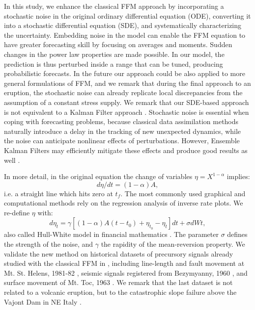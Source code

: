 \documentclass{article}
\begin{document}
In this study, we enhance the classical FFM approach by incorporating a stochastic noise in the original ordinary differential equation (ODE), converting it into a stochastic differential equation (SDE), and systematically characterizing the uncertainty. Embedding noise in the model can enable the FFM equation to have greater forecasting skill by focusing on averages and moments. Sudden changes in the power law properties are made possible. In our model, the prediction is thus perturbed inside a range that can be tuned, producing probabilistic forecasts. In the future our approach could be also applied to more general formulations of FFM, and we remark that during the final approach to an eruption, the stochastic noise can already replicate local discrepancies from the assumption of a constant stress supply. We remark that our SDE-based approach is not equivalent to a Kalman Filter approach \citep{Zhan2017}. Stochastic noise is essential when coping with forecasting problems, because classical data assimilation methods naturally introduce a delay in the tracking of new unexpected dynamics, while the noise can anticipate nonlinear effects of perturbations. However, Ensemble Kalman Filters may efficiently mitigate these effects and produce good results as well \citep{Houtekamer1998, Evensen2003}.

In more detail, in the original equation the change of variables $\eta=X^{1-\alpha}$ implies:
$$d\eta/dt=(1-\alpha)A,$$
i.e. a straight line which hits zero at $t_f$. The most commonly used graphical and computational methods rely on the regression analysis of inverse rate plots. We re-define $\eta$ with:
$$d\eta_t=\gamma[(1-\alpha)A(t-t_0)+\eta_{t_0}-\eta_t]dt+\sigma dWt,$$
also called Hull-White model in financial mathematics \citep{HullWhite1990}. The parameter $\sigma$ defines the strength of the noise, and $\gamma$ the rapidity of the mean-reversion property. We validate the new method on historical datasets of precursory signals already studied with the classical FFM in \cite{Voight1988}, including line-length and fault movement at Mt. St. Helens, 1981-82 \citep{Swanson1982,Chadwick1982}, seismic signals registered from Bezymyanny, 1960 \citep{Tokarev1966,Tokarev1971,Tokarev1983}, and surface movement of Mt. Toc, 1963 \citep{Muller1964,Voight1982}. We remark that the last dataset is not related to a volcanic eruption, but to the catastrophic slope failure above the Vajont Dam in NE Italy \citep{Kilburn2003b}.
\end{document}
